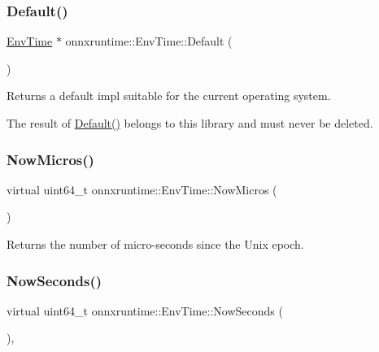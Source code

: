 \subsubsection{\texorpdfstring{Default()}{Default()}}
{\footnotesize\ttfamily \mbox{\hyperlink{classonnxruntime_1_1EnvTime}{Env\+Time}} $\ast$ onnxruntime\+::\+Env\+Time\+::\+Default (\begin{DoxyParamCaption}{ }\end{DoxyParamCaption})\hspace{0.3cm}{\ttfamily [static]}}



Returns a default impl suitable for the current operating system. 

The result of \mbox{\hyperlink{classonnxruntime_1_1EnvTime_a44c73be1935c14769fc2879f9618cebf}{Default()}} belongs to this library and must never be deleted. \mbox{\label{classonnxruntime_1_1EnvTime_a1041208f7cb0ba8afaaa3d354e0a6e63}} 
\subsubsection{\texorpdfstring{Now\+Micros()}{NowMicros()}}
{\footnotesize\ttfamily virtual uint64\+\_\+t onnxruntime\+::\+Env\+Time\+::\+Now\+Micros (\begin{DoxyParamCaption}{ }\end{DoxyParamCaption})\hspace{0.3cm}{\ttfamily [pure virtual]}}



Returns the number of micro-\/seconds since the Unix epoch. 

\mbox{\label{classonnxruntime_1_1EnvTime_a1c0c2e072d0afbf63f64729c2cb764df}} 
\subsubsection{\texorpdfstring{Now\+Seconds()}{NowSeconds()}}
{\footnotesize\ttfamily virtual uint64\+\_\+t onnxruntime\+::\+Env\+Time\+::\+Now\+Seconds (\begin{DoxyParamCaption}{ }\end{DoxyParamCaption})\hspace{0.3cm}{\ttfamily [inline]}, {\ttfamily [virtual]}}




